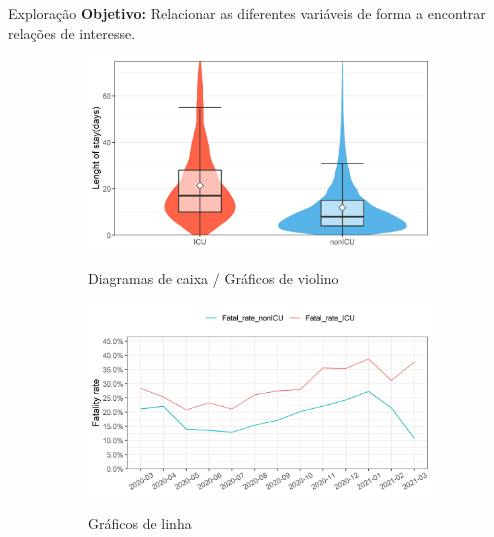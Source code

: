 \documentclass[pdf]
{beamer}
\begin{document}
\begin{frame}{Exploração}
\textbf{Objetivo:} Relacionar as diferentes variáveis de forma a encontrar relações de interesse.

\vspace{2cm}

\begin{figure}
	\centering
	\begin{subfigure}[][40pt][b]{0.3\textwidth}
		\caption*{Diagramas de caixa / Gráficos de violino}
		\vspace{-0.4cm}
    		\includegraphics[width=\textwidth]{Imagens/violinBox_Type.jpeg}\\
	\end{subfigure}
	\begin{subfigure}[][40pt][c]{0.3\textwidth}
		\caption*{Gráficos de linha}
		\vspace{-0.4cm}
   		 \includegraphics[width=\textwidth]{Imagens/PopVarPlot_fatalRate.jpeg}\\
	\end{subfigure}
	\begin{subfigure}[][40pt][t]{0.3\textwidth}

\end{subfigure}
\end{figure}
\end{frame}
\end{document}
